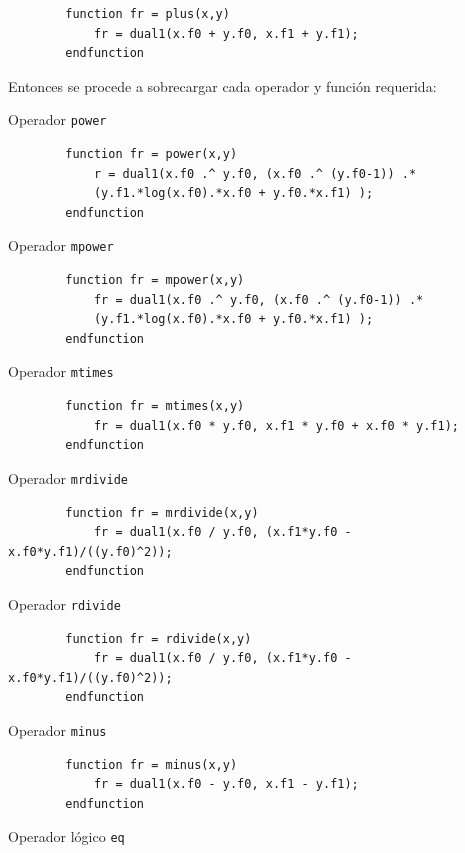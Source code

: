 \documentclass[a4paper, 12pt]{article}
\begin{document}
    \begin{verbatim}
        function fr = plus(x,y)
            fr = dual1(x.f0 + y.f0, x.f1 + y.f1);
        endfunction
    \end{verbatim}

    Entonces se procede a sobrecargar cada operador y función requerida:

    Operador \verb|power|

    \begin{verbatim}
        function fr = power(x,y)
            r = dual1(x.f0 .^ y.f0, (x.f0 .^ (y.f0-1)) .* 
            (y.f1.*log(x.f0).*x.f0 + y.f0.*x.f1) );
        endfunction
    \end{verbatim}

    Operador \verb|mpower|

    \begin{verbatim}
        function fr = mpower(x,y)
            fr = dual1(x.f0 .^ y.f0, (x.f0 .^ (y.f0-1)) .* 
            (y.f1.*log(x.f0).*x.f0 + y.f0.*x.f1) );
        endfunction
    \end{verbatim}

    Operador \verb|mtimes|

    \begin{verbatim}
        function fr = mtimes(x,y)
            fr = dual1(x.f0 * y.f0, x.f1 * y.f0 + x.f0 * y.f1);
        endfunction
    \end{verbatim}

    Operador \verb|mrdivide|

    \begin{verbatim}
        function fr = mrdivide(x,y)
            fr = dual1(x.f0 / y.f0, (x.f1*y.f0 - x.f0*y.f1)/((y.f0)^2));
        endfunction
    \end{verbatim}

    Operador \verb|rdivide|

    \begin{verbatim}
        function fr = rdivide(x,y)
            fr = dual1(x.f0 / y.f0, (x.f1*y.f0 - x.f0*y.f1)/((y.f0)^2));
        endfunction
    \end{verbatim}
    
    Operador \verb|minus|

    \begin{verbatim}
        function fr = minus(x,y)
            fr = dual1(x.f0 - y.f0, x.f1 - y.f1);
        endfunction
    \end{verbatim}

    Operador lógico \verb|eq|
\end{document}
